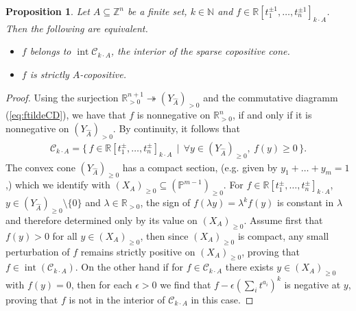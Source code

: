 \documentclass[a4paper,11pt]{amsart}
\newtheorem{proposition}[theorem]{Proposition}
\theoremstyle{definition}
\DeclareMathOperator{\interior}{int}
\newcommand{\RR}{\mathbb{R}}
\newcommand{\PP}{\mathbb{P}}
\begin{document}
\begin{proposition}
\label{Prop:InteriorOfCA}
Let $A \subseteq \mathbb{Z}^n$ be a finite set, $k \in \mathbb{N}$ and $f \in \RR[t_1^{\pm 1}, \dots , t_n^{\pm 1}]_{k \cdot A}$. 
Then the following are equivalent.
\begin{itemize}
    \item[(i)] $f$ belongs to $\interior \mathcal{C}_{k\cdot A}$, the interior of the sparse copositive cone.
    \item[(ii)] $f$ is strictly  $A$-copositive.
\end{itemize}
\end{proposition}
\begin{proof}
Using  the surjection $\mathbb{R}^{n+1}_{>0} \twoheadrightarrow (Y_{\hat{A}})_{>0}$ and the commutative diagramm (\ref{eq:ftildeCD}), we have that $f$ is nonnegative on $\mathbb{R}^n_{>0}$, if and only if it is nonnegative on $(Y_{\hat{A}})_{>0}$. By continuity, it follows that
\begin{align}
\label{Eq:CkA_correspondence}
\mathcal{C}_{k \cdot A} = \{\, f \in \mathbb{R}[t_1^\pm,\ldots,t_n^\pm]_{k \cdot A} \, \mid \, \forall y \in (Y_{\hat{A}})_{\ge 0}, \ f(y) \geq 0  \,\}.
\end{align}
The convex cone $(Y_{\hat{A}})_{\ge 0}$ has a compact section, (e.g. given by $y_1 + \dots + y_m = 1$,) which we identify with  $(X_{A})_{\ge 0} \subseteq (\PP^{m-1})_{\ge 0}$. For $f \in \mathbb{R}[t_1^\pm,\ldots,t_n^\pm]_{k \cdot A}$, $y \in (Y_{\hat{A}})_{\ge 0} \setminus \{0\}$ and $\lambda \in \RR_{>0}$, the sign of $f(\lambda y) = \lambda^k f(y)$ is constant in $\lambda$ and therefore determined only by its value on $(X_{A})_{\ge 0}$. 
Assume first that $f(y)>0$ for all $y\in (X_A)_{\geq 0}$, then since  $(X_A)_{\geq 0}$ is compact, any small perturbation of $f$ remains strictly positive on $(X_A)_{\geq 0}$, proving that $f\in \interior(\mathcal{C}_{k\cdot A})$. On the other hand if for $f\in \mathcal{C}_{k\cdot A}$ there exists $y\in (X_A)_{\geq 0}$ with $f(y)=0$, then for each $\epsilon>0$ we find that $f-\epsilon (\sum_i t^{a_i})^k$ is negative at $y$, proving that $f$ is not in the interior of $\mathcal{C}_{k\cdot A}$ in this case.\end{proof}
\end{document}
